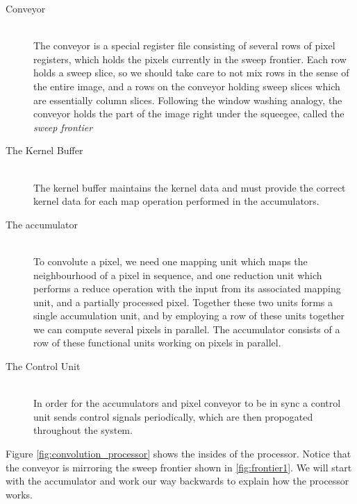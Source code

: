 \begin{description}
    \item[Conveyor] \hfill\\ 
        The conveyor is a special register file consisting of several rows of pixel registers, which holds the pixels currently in the sweep frontier.
        Each row holds a sweep slice, so we should take care to not mix rows in the sense of the entire image, and a rows on the conveyor holding sweep slices which are essentially column slices.
        Following the window washing analogy, the conveyor holds the part of the image right under the squeegee, called the \textit{sweep frontier}
    \item[The Kernel Buffer] \hfill\\
        The kernel buffer maintains the kernel data and must provide the correct kernel data for each map operation performed in the accumulators.
    \item[The accumulator] \hfill\\
        To convolute a pixel, we need one mapping unit which maps the neighbourhood of a pixel in sequence, and one reduction unit which performs a reduce operation with the input from its associated mapping unit, and a partially processed pixel.
        Together these two units forms a single accumulation unit, and by employing a row of these units together we can compute several pixels in parallel.
        The accumulator consists of a row of these functional units working on pixels in parallel.
    \item[The Control Unit] \hfill\\
        In order for the accumulators and pixel conveyor to be in sync a control unit sends control signals periodically, which are then propogated throughout the system.
\end{description}

Figure \ref{fig:convolution_processor} shows the insides of the processor. Notice that the conveyor is mirroring the sweep frontier shown in \ref{fig:frontier1}.
We will start with the accumulator and work our way backwards to explain how the processor works.

